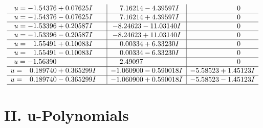 \documentclass[1p]{elsarticle_modified}
\theoremstyle{definition}
\begin{document}
$$\begin{array}{c|c|c}
\begin{aligned}
u &= -1.54376 + 0.07625 I\end{aligned}
 & \phantom{-}7.16214 - 4.39597 I & \phantom{-0.000000 } 0 \\ \hline\begin{aligned}
u &= -1.54376 - 0.07625 I\end{aligned}
 & \phantom{-}7.16214 + 4.39597 I & \phantom{-0.000000 } 0 \\ \hline\begin{aligned}
u &= -1.53396 + 0.20587 I\end{aligned}
 & -8.24623 - 11.03140 I & \phantom{-0.000000 } 0 \\ \hline\begin{aligned}
u &= -1.53396 - 0.20587 I\end{aligned}
 & -8.24623 + 11.03140 I & \phantom{-0.000000 } 0 \\ \hline\begin{aligned}
u &= \phantom{-}1.55491 + 0.10083 I\end{aligned}
 & \phantom{-}0.00334 + 6.33230 I & \phantom{-0.000000 } 0 \\ \hline\begin{aligned}
u &= \phantom{-}1.55491 - 0.10083 I\end{aligned}
 & \phantom{-}0.00334 - 6.33230 I & \phantom{-0.000000 } 0 \\ \hline\begin{aligned}
u &= -1.56390\phantom{ +0.000000I}\end{aligned}
 & \phantom{-}2.49097\phantom{ +0.000000I} & \phantom{-0.000000 } 0 \\ \hline\begin{aligned}
u &= \phantom{-}0.189740 + 0.365299 I\end{aligned}
 & -1.060900 - 0.590018 I & -5.58523 + 1.45123 I \\ \hline\begin{aligned}
u &= \phantom{-}0.189740 - 0.365299 I\end{aligned}
 & -1.060900 + 0.590018 I & -5.58523 - 1.45123 I\\
 \hline 
 \end{array}$$\newpage
\newpage\renewcommand{\arraystretch}{1}
\centering \section*{ II. u-Polynomials}
\end{document}

